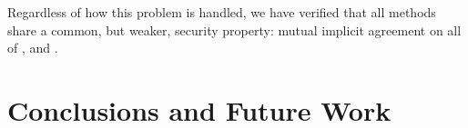\documentclass[runningheads, envcountsame, hidelinks, a4paper, draft, x11names]{llncs}
\begin{document}
Regardless of how this problem is handled, we have verified that all methods
share a common, but weaker, security property: mutual implicit agreement
on all of \mGxy{}, \mGiy{} and \mGrx{}.
%

%
%

\section{Conclusions and Future Work}
\label{sec:conclusions}
%
\end{document}
